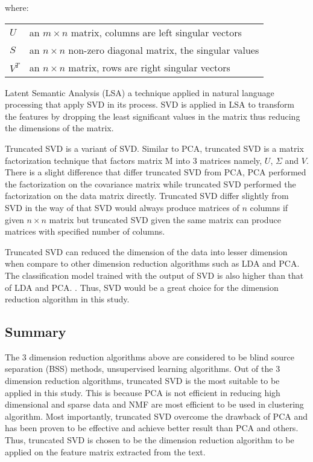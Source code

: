 where:
\begin{center}
	\begin{tabular}{l @{ $=$ } l}
		$U$ & an $m \times n$ matrix, columns are left singular vectors \\
		$S$ & an $n \times n$ non-zero diagonal matrix, the singular values \\
		$V^{T}$ & an $n \times n$ matrix, rows are right singular vectors \\
	\end{tabular}
\end{center}

	
Latent Semantic Analysis (LSA) a technique applied in natural language processing that apply SVD in its process. SVD is applied in LSA to transform the features by dropping the least significant values in the matrix thus reducing the dimensions of the matrix. \cite{fuzzyLash}

Truncated SVD is a variant of SVD. Similar to PCA, truncated SVD is a matrix factorization technique that factors matrix M into 3 matrices namely, $U$, $\Sigma$ and $V$. There is a slight difference that differ truncated SVD from PCA, PCA performed the factorization on the covariance matrix while truncated SVD performed the factorization on the data matrix directly. Truncated SVD differ slightly from SVD in the way of that SVD would always produce matrices of $n$ columns if given $n \times n$ matrix but truncated SVD given the same matrix can produce matrices with specified number of columns. \cite{truncatedSVD}

Truncated SVD can reduced the dimension of the data into lesser dimension when compare to other dimension reduction algorithms such as LDA and PCA. The classification model trained with the output of SVD is also higher than that of LDA and PCA. \cite{dimRedCat}. Thus, SVD would be a great choice for the dimension reduction algorithm in this study.\\
	
\subsection{Summary}
The 3 dimension reduction algorithms above are considered to be blind source separation (BSS) methods, unsupervised learning algorithms. Out of the 3 dimension reduction algorithms, truncated SVD is the most suitable to be applied in this study. This is because PCA is not efficient in reducing high dimensional and sparse data and NMF are most efficient to be used in clustering algorithm. Most importantly, truncated SVD overcome the drawback of PCA and has been proven to be effective and achieve better result than PCA and others. Thus, truncated SVD is chosen to be the dimension reduction algorithm to be applied on the feature matrix extracted from the text.\\

